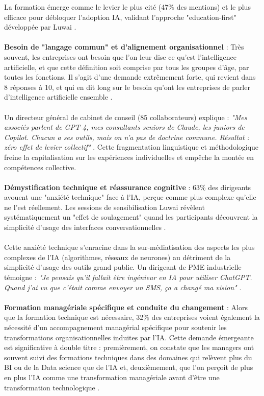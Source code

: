 La formation émerge comme le levier le plus cité (47\% des mentions) et le plus efficace pour débloquer l'adoption IA, validant l'approche "education-first" développée par Luwai \cite{luwai2025meetings}.
\\\\
\textbf{Besoin de "langage commun" et d'alignement organisationnel} : Très souvent, les entreprises ont besoin que l'on leur dise ce qu'est l'intelligence artificielle, et que cette définition soit comprise par tous les groupes d'âge, par toutes les fonctions. Il s'agit d'une demande extrêmement forte, qui revient dans 8 réponses à 10, et qui en dit long sur le besoin qu'ont les entreprises de parler d'intelligence artificielle ensemble \cite{schein2017organizational}.
\\\\
Un directeur général de cabinet de conseil (85 collaborateurs) explique : \emph{"Mes associés parlent de GPT-4, mes consultants seniors de Claude, les juniors de Copilot. Chacun a ses outils, mais on n'a pas de doctrine commune. Résultat : zéro effet de levier collectif"} \cite{luwai2025antilogy}. Cette fragmentation linguistique et méthodologique freine la capitalisation sur les expériences individuelles et empêche la montée en compétences collective.
\\\\
\textbf{Démystification technique et réassurance cognitive} : 63\% des dirigeants avouent une "anxiété technique" face à l'IA, perçue comme plus complexe qu'elle ne l'est réellement. Les sessions de sensibilisation Luwai révèlent systématiquement un "effet de soulagement" quand les participants découvrent la simplicité d'usage des interfaces conversationnelles \cite{luwai2025meetings}.
\\\\
Cette anxiété technique s'enracine dans la sur-médiatisation des aspects les plus complexes de l'IA (algorithmes, réseaux de neurones) au détriment de la simplicité d'usage des outils grand public. Un dirigeant de PME industrielle témoigne : \emph{"Je pensais qu'il fallait être ingénieur en IA pour utiliser ChatGPT. Quand j'ai vu que c'était comme envoyer un SMS, ça a changé ma vision"} \cite{luwai2025meetings}.
\\\\
\textbf{Formation managériale spécifique et conduite du changement} : Alors que la formation technique est nécessaire, 32\% des entreprises voient également la nécessité d’un accompagnement managérial spécifique pour soutenir les transformations organisationnelles induites par l’IA. Cette demande émergeante est significative à double titre : premièrement, on constate que les managers ont souvent suivi des formations techniques dans des domaines qui relèvent plus du BI ou de la Data science que de l’IA et, deuxièmement, que l’on perçoit de plus en plus l’IA comme une transformation managériale avant d’être une transformation technologique \cite{mcafee2017machine}.

